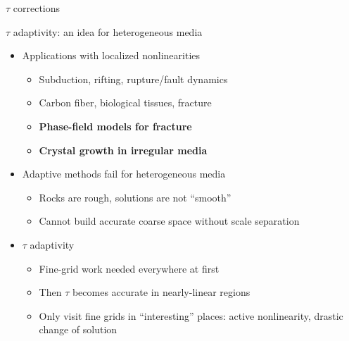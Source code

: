 \documentclass{beamer}
\begin{document}
\begin{frame}{$\tau$ corrections}
\begin{figure}
\end{figure}
\end{frame}

\begin{frame}{$\tau$ adaptivity: an idea for heterogeneous media}
  \begin{itemize}
  \item Applications with localized nonlinearities
    \begin{itemize}
    \item Subduction, rifting, rupture/fault dynamics
    \item Carbon fiber, biological tissues, fracture
    \item {\bf Phase-field models for fracture}
    \item {\bf Crystal growth in irregular media}
    \end{itemize}
  \item Adaptive methods fail for heterogeneous media
    \begin{itemize}
    \item Rocks are rough, solutions are not ``smooth''
    \item Cannot build accurate coarse space without scale separation
    \end{itemize}
  \item $\tau$ adaptivity
    \begin{itemize}
    \item Fine-grid work needed everywhere at first
    \item Then $\tau$ becomes accurate in nearly-linear regions
    \item Only visit fine grids in ``interesting'' places: active nonlinearity, drastic change of solution
    \end{itemize}
  \end{itemize}
\end{frame}
\end{document}
